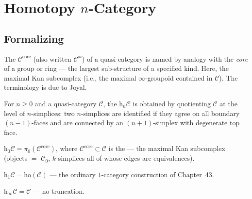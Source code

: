 \section{Homotopy $n$-Category}
\label{sec:homotopy-n-category}

\subsection{Formalizing}

\begin{nameorigin}
The  $\mathcal{C}^{\mathrm{core}}$ (also written
$\mathcal{C}^{\simeq}$) of a quasi-category is named by analogy with
the \emph{core} of a group or ring — the largest sub-structure of a
specified kind. Here, the maximal Kan subcomplex (i.e., the maximal
$\infty$-groupoid contained in $\mathcal{C}$). The terminology is due
to Joyal.
\end{nameorigin}

\begin{definition}
\label{def:homotopy-n-cat}
For $n \geq 0$ and a quasi-category $\mathcal{C}$, the  $\mathrm{h}_n \mathcal{C}$ is obtained by quotienting
$\mathcal{C}$ at the level of $n$-simplices: two $n$-simplices are
identified if they agree on all boundary $(n-1)$-faces and are connected
by an $(n+1)$-simplex with degenerate top face.
\end{definition}

\begin{example_thm}[$n = 0$: homotopy set of equivalence classes]
\label{ex:h0}
$\mathrm{h}_0 \mathcal{C} = \pi_0(\mathcal{C}^{\mathrm{core}})$, where
$\mathcal{C}^{\mathrm{core}} \subset \mathcal{C}$ is the  —
the maximal Kan subcomplex (objects $=$ $\mathcal{C}_0$, $k$-simplices
all of whose edges are equivalences).
\end{example_thm}

\begin{example_thm}[$n = 1$: ordinary homotopy category]
\label{ex:h1}
$\mathrm{h}_1 \mathcal{C} = \mathrm{ho}(\mathcal{C})$ — the ordinary
$1$-category construction of Chapter~43.
\end{example_thm}

\begin{example_thm}[$n = \infty$: identity]
\label{ex:hinf}
$\mathrm{h}_\infty \mathcal{C} = \mathcal{C}$ — no truncation.
\end{example_thm}


